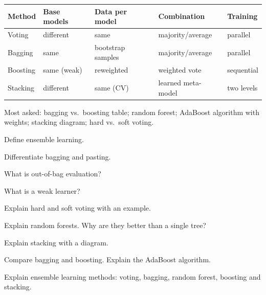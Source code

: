 \begin{center}
\small
\begin{tabular}{@{}lllll@{}}
\toprule
\textbf{Method} & \textbf{Base models} & \textbf{Data per model} & \textbf{Combination} & \textbf{Training}\\
\midrule
Voting & different & same & majority/average & parallel\\
Bagging & same & bootstrap samples & majority/average & parallel\\
Boosting & same (weak) & reweighted & weighted vote & sequential\\
Stacking & different & same (CV) & learned meta-model & two levels\\
\bottomrule
\end{tabular}
\end{center}

\begin{imp}
Most asked: bagging vs.\ boosting table; random forest; AdaBoost algorithm with weights; stacking diagram; hard vs.\ soft voting.
\end{imp}

\begin{iq}
\item \twom Define ensemble learning.
\item \twom Differentiate bagging and pasting.
\item \twom What is out-of-bag evaluation?
\item \twom What is a weak learner?
\item \fivem Explain hard and soft voting with an example.
\item \fivem Explain random forests. Why are they better than a single tree?
\item \fivem Explain stacking with a diagram.
\item \tenm Compare bagging and boosting. Explain the AdaBoost algorithm.
\item \tenm Explain ensemble learning methods: voting, bagging, random forest, boosting and stacking.
\end{iq}
